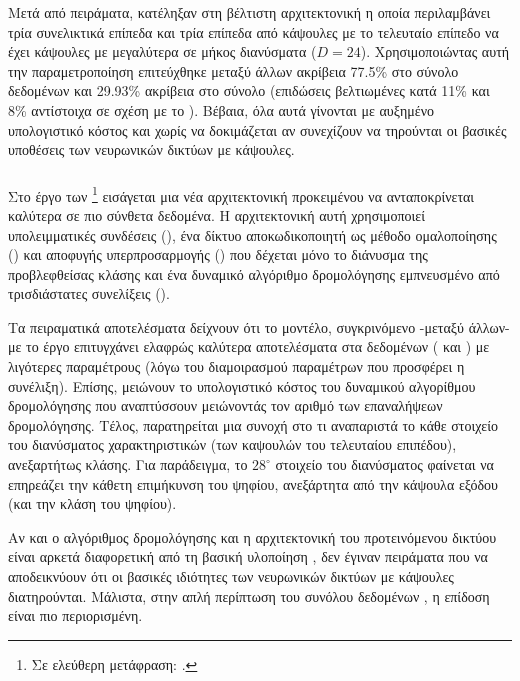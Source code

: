 Μετά από πειράματα, κατέληξαν στη βέλτιστη αρχιτεκτονική η οποία περιλαμβάνει τρία συνελικτικά επίπεδα και τρία επίπεδα από κάψουλες με το τελευταίο επίπεδο να έχει κάψουλες με μεγαλύτερα σε μήκος διανύσματα ($D=24$). Χρησιμοποιώντας αυτή την παραμετροποίηση επιτεύχθηκε μεταξύ άλλων ακρίβεια 77.5\% στο σύνολο δεδομένων  και 29.93\% ακρίβεια στο σύνολο  (επιδώσεις βελτιωμένες κατά 11\% και 8\% αντίστοιχα σε σχέση με το \cite{sabour2017dynamic}). Βέβαια, όλα αυτά γίνονται με αυξημένο υπολογιστικό κόστος και χωρίς να δοκιμάζεται αν συνεχίζουν να τηρούνται οι βασικές υποθέσεις των νευρωνικών δικτύων με κάψουλες.

\subsubsection{}

Στο έργο των  \footnote{Σε ελεύθερη μετάφραση: .} \cite{rajasegaran2019deepcaps} εισάγεται μια νέα αρχιτεκτονική προκειμένου να ανταποκρίνεται καλύτερα σε πιο σύνθετα δεδομένα. Η αρχιτεκτονική αυτή χρησιμοποιεί υπολειμματικές συνδέσεις (), ένα δίκτυο αποκωδικοποιητή ως μέθοδο ομαλοποίησης () και αποφυγής υπερπροσαρμογής () που δέχεται μόνο το διάνυσμα της προβλεφθείσας κλάσης και ένα δυναμικό αλγόριθμο δρομολόγησης εμπνευσμένο από τρισδιάστατες συνελίξεις (). \par

Τα πειραματικά αποτελέσματα δείχνουν ότι το μοντέλο, συγκρινόμενο -μεταξύ άλλων- με το έργο \cite{sabour2017dynamic} επιτυγχάνει ελαφρώς καλύτερα αποτελέσματα στα δεδομένων ( και ) με λιγότερες παραμέτρους (λόγω του διαμοιρασμού παραμέτρων που προσφέρει η συνέλιξη). Επίσης, μειώνουν το υπολογιστικό κόστος του δυναμικού αλγορίθμου δρομολόγησης που αναπτύσσουν μειώνοντάς τον αριθμό των επαναλήψεων δρομολόγησης. Τέλος, παρατηρείται μια συνοχή στο τι αναπαριστά το κάθε στοιχείο του διανύσματος χαρακτηριστικών (των καψουλών του τελευταίου επιπέδου), ανεξαρτήτως κλάσης. Για παράδειγμα, το $28^\circ$ στοιχείο του διανύσματος φαίνεται να επηρεάζει την κάθετη επιμήκυνση του ψηφίου, ανεξάρτητα από την κάψουλα εξόδου (και την κλάση του ψηφίου). \par

Αν και ο αλγόριθμος δρομολόγησης και η αρχιτεκτονική του προτεινόμενου δικτύου είναι αρκετά διαφορετική από τη βασική υλοποίηση \cite{sabour2017dynamic}, δεν έγιναν πειράματα που να αποδεικνύουν ότι οι βασικές ιδιότητες των νευρωνικών δικτύων με κάψουλες διατηρούνται. Μάλιστα, στην απλή περίπτωση του συνόλου δεδομένων , η επίδοση είναι πιο περιορισμένη.


